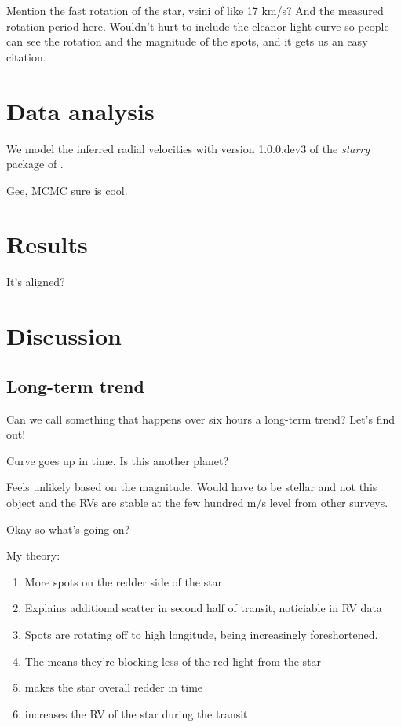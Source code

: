 \documentclass[twocolumn]{aastex62}
\begin{document}
Mention the fast rotation of the star, vsini of like 17 km/s? And the measured rotation period here. Wouldn't hurt to include the eleanor light curve so people can see the rotation and the magnitude of the spots, and it gets us an easy citation.



\section{Data analysis}

We model the inferred radial velocities with version 1.0.0.dev3 of the \textit{starry} package of \citet{Luger19}. 

Gee, MCMC sure is cool.


\section{Results}

It's aligned?

\section{Discussion}

\subsection{Long-term trend}

Can we call something that happens over six hours a long-term trend? Let's find out!

Curve goes up in time. Is this another planet?

Feels unlikely based on the magnitude.
Would have to be stellar and not this object and the RVs are stable at the few hundred m/s level from other surveys.

Okay so what's going on?

My theory:
\begin{enumerate}
    \item More spots on the redder side of the star 
    \item Explains additional scatter in second half of transit, noticiable in RV data
    \item Spots are rotating off to high longitude, being increasingly foreshortened.
    \item The means they're blocking less of the red light from the star
    \item makes the star overall redder in time
    \item increases the RV of the star during the transit
\end{enumerate}
\end{document}

